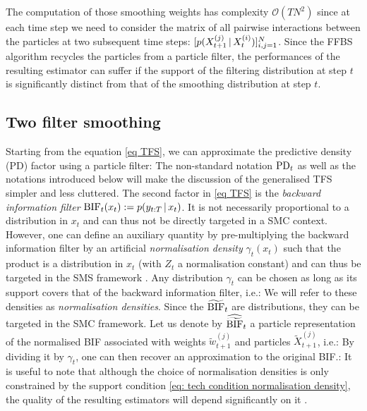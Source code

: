 The computation of those smoothing weights has complexity $\mathcal O(TN^{2})$ since at each time step we need to consider the matrix of all pairwise interactions between the particles at two subsequent time steps: $[p(X^{(j)}_{t+1}\,|\, X^{(i)}_{t})]_{i,j=1}^{N}$. Since the FFBS algorithm recycles the particles from a particle filter, the performances of the resulting estimator can suffer if the support of the filtering distribution at step $t$ is significantly distinct from that of the smoothing distribution at step $t$.

\subsection{\label{introTFS}Two filter smoothing}
Starting from the equation \eqref{eq TFS}, we can approximate the predictive density (PD) factor using a particle filter:%
%
%
The non-standard notation $\text{PD}_{t}$ as well as the notations introduced below will make the discussion of the generalised TFS simpler and less cluttered. The second factor in \eqref{eq TFS} is the \emph{backward information filter} $\text{BIF}_t(x_t):=p(y_{t:T}\,|\, x_{t})$. It is not necessarily proportional to a distribution in $x_{t}$ and can thus not be directly targeted in a SMC context. However, one can define an auxiliary quantity by pre-multiplying the backward information filter by an artificial \emph{normalisation density} $\gamma_{t}(x_{t})$ such that the product
%
%
is a distribution in $x_{t}$ (with $Z_{t}$ a normalisation constant) and can thus be targeted in the SMS framework \citep{briers10}. Any distribution $\gamma_{t}$ can be chosen as long as its support covers that of the backward information filter, i.e.:
%
We will refer to these densities as \emph{normalisation densities}. Since the $\widetilde{\text{BIF}}_{t}$ are distributions, they can be targeted in the SMC framework. Let us denote by $\widehat{\widetilde{\text{BIF}}}_{t}$ a particle representation of the normalised BIF associated with weights $\tilde w_{t+1}^{(j)}$ and particles $\tilde X^{(j)}_{t+1}$, i.e.:
%
%
By dividing it by $\gamma_{t}$, one can then recover an approximation to the original BIF.:
%
%
It is useful to note that although the choice of normalisation densities is only constrained by the support condition \eqref{eq: tech condition normalisation density}, the quality of the resulting estimators will depend significantly on it \citep{fearnhead10, taghavi12}.


